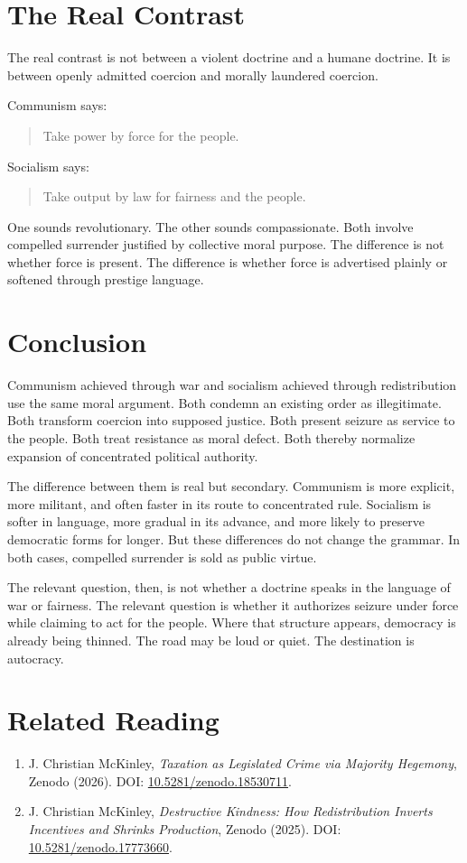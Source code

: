 \documentclass[12pt,letterpaper]{article}
\begin{document}
\section{The Real Contrast}

The real contrast is not between a violent doctrine and a humane doctrine. It is between
openly admitted coercion and morally laundered coercion.

Communism says:
\begin{quote}
Take power by force for the people.
\end{quote}

Socialism says:
\begin{quote}
Take output by law for fairness and the people.
\end{quote}

One sounds revolutionary. The other sounds compassionate. Both involve compelled surrender
justified by collective moral purpose. The difference is not whether force is present. The
difference is whether force is advertised plainly or softened through prestige language.

\section{Conclusion}

Communism achieved through war and socialism achieved through redistribution use the same
moral argument. Both condemn an existing order as illegitimate. Both transform coercion
into supposed justice. Both present seizure as service to the people. Both treat resistance as
moral defect. Both thereby normalize expansion of concentrated political authority.

The difference between them is real but secondary. Communism is more explicit, more
militant, and often faster in its route to concentrated rule. Socialism is softer in language,
more gradual in its advance, and more likely to preserve democratic forms for longer. But
these differences do not change the grammar. In both cases, compelled surrender is sold as
public virtue.

The relevant question, then, is not whether a doctrine speaks in the language of war or
fairness. The relevant question is whether it authorizes seizure under force while claiming to
act for the people. Where that structure appears, democracy is already being thinned. The
road may be loud or quiet. The destination is autocracy.

\section*{Related Reading}

\begin{enumerate}
    \item J. Christian McKinley, \emph{Taxation as Legislated Crime via Majority Hegemony}, Zenodo (2026). DOI: \href{https://doi.org/10.5281/zenodo.18530711}{10.5281/zenodo.18530711}.
    \item J. Christian McKinley, \emph{Destructive Kindness: How Redistribution Inverts Incentives and Shrinks Production}, Zenodo (2025). DOI: \href{https://doi.org/10.5281/zenodo.17773660}{10.5281/zenodo.17773660}.
\end{enumerate}
\end{document}
